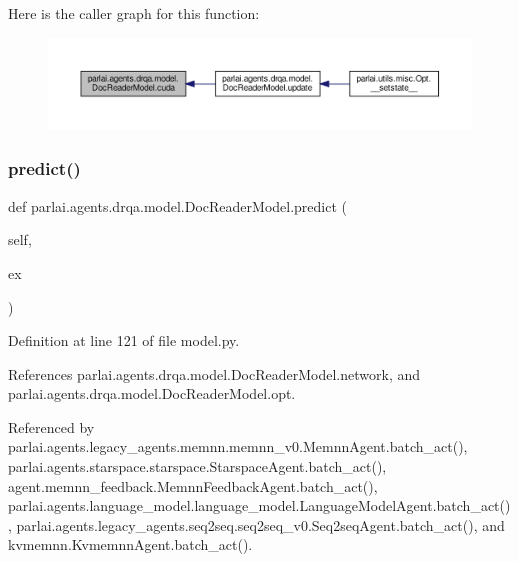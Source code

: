 Here is the caller graph for this function\+:
\nopagebreak
\begin{figure}[H]
\begin{center}
\leavevmode
\includegraphics[width=350pt]{classparlai_1_1agents_1_1drqa_1_1model_1_1DocReaderModel_aaefd7c0afecedb97555c466befd2a68c_icgraph}
\end{center}
\end{figure}
\mbox{\label{classparlai_1_1agents_1_1drqa_1_1model_1_1DocReaderModel_a798f609dcd78b3e66e00a81f26f12603}} 
\subsubsection{\texorpdfstring{predict()}{predict()}}
{\footnotesize\ttfamily def parlai.\+agents.\+drqa.\+model.\+Doc\+Reader\+Model.\+predict (\begin{DoxyParamCaption}\item[{}]{self,  }\item[{}]{ex }\end{DoxyParamCaption})}



Definition at line 121 of file model.\+py.



References parlai.\+agents.\+drqa.\+model.\+Doc\+Reader\+Model.\+network, and parlai.\+agents.\+drqa.\+model.\+Doc\+Reader\+Model.\+opt.



Referenced by parlai.\+agents.\+legacy\+\_\+agents.\+memnn.\+memnn\+\_\+v0.\+Memnn\+Agent.\+batch\+\_\+act(), parlai.\+agents.\+starspace.\+starspace.\+Starspace\+Agent.\+batch\+\_\+act(), agent.\+memnn\+\_\+feedback.\+Memnn\+Feedback\+Agent.\+batch\+\_\+act(), parlai.\+agents.\+language\+\_\+model.\+language\+\_\+model.\+Language\+Model\+Agent.\+batch\+\_\+act(), parlai.\+agents.\+legacy\+\_\+agents.\+seq2seq.\+seq2seq\+\_\+v0.\+Seq2seq\+Agent.\+batch\+\_\+act(), and kvmemnn.\+Kvmemnn\+Agent.\+batch\+\_\+act().


